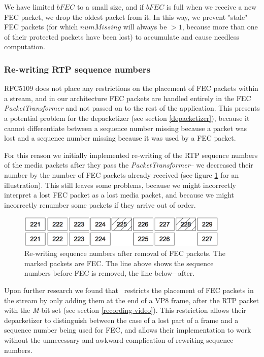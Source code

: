 \documentclass[twoside,openright,a4paper,12pt,english]{article}
\begin{document}
We have limited $bFEC$ to a small size, and if $bFEC$ is full when we receive a new FEC packet, we drop the oldest packet from it.
In this way, we prevent "stale" FEC packets (for
which $numMissing$ will always be $>1$, because more than one of their
protected packets have been lost) to accumulate and cause needless computation.


\subsubsection{Re-writing RTP sequence numbers}
RFC5109 does not place any restrictions on the placement of FEC packets within
a stream, and in our architecture FEC packets are handled entirely in the FEC
\emph{PacketTransformer} and not passed on to the rest of the application. This
presents a potential problem for the depacketizer (see section
\ref{depacketizer}), because it cannot differentiate
between a sequence number missing because a packet was lost and a sequence number missing
because it was used by a FEC packet.

For this reason we initially implemented re-writing of the RTP sequence numbers of
the media packets after they pass the \emph{PacketTransformer}-- we decreased their
number by the number of FEC packets already received (see figure \ref{fec-seqs} for an
illustration). This still leaves some problems, because we might incorrectly interpret
a lost FEC packet as a lost media packet, and because we might incorrectly renumber
some packets if they arrive out of order.

\begin{figure}[h]
   \centering
        \includegraphics[width=0.9\textwidth]{./pics/fec-seqs.eps}
        \caption{Re-writing sequence numbers after removal of FEC packets. The
        marked packets are FEC. The line above shows the sequence numbers
        before FEC is removed, the line below-- after.}
   \label{fec-seqs}
\end{figure}

Upon further research we found that \wrtc\ restricts the placement of FEC
packets in the stream by only adding them at the end of a VP8 frame, after the
RTP packet with the \emph{M}-bit set (see section \ref{recording-video}). This
restriction allows their depacketizer to distinguish between the case of a lost
part of a frame and a sequence number being used for FEC, and allows their implementation
to work without the unnecessary and awkward complication of rewriting sequence numbers.
\end{document}
